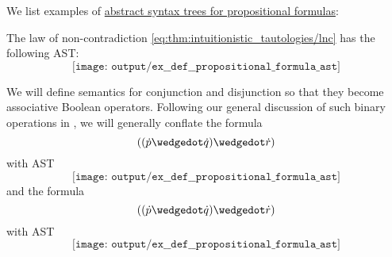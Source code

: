 \begin{example}\label{ex:def:propositional_fomula_ast}
  We list examples of \hyperref[def:propositional_fomula_ast]{abstract syntax trees for propositional formulas}:
  \begin{thmenum}
     The law of non-contradiction \eqref{eq:thm:intuitionistic_tautologies/lnc} has the following AST:
    \begin{equation*}
      \texttt{[image: output/ex\_\_def\_\_propositional\_formula\_ast]}
    \end{equation*}

     We will define semantics for conjunction and disjunction so that they become associative Boolean operators. Following our general discussion of such binary operations in , we will generally conflate the formula
    \begin{equation*}
      ((\synp \synwedge \synq) \synwedge \syn r)
    \end{equation*}
    with AST
    \begin{equation*}
      \texttt{[image: output/ex\_\_def\_\_propositional\_formula\_ast]}
    \end{equation*}
    and the formula
    \begin{equation*}
      ((\synp \synwedge \synq) \synwedge \syn r)
    \end{equation*}
    with AST
    \begin{equation*}
      \texttt{[image: output/ex\_\_def\_\_propositional\_formula\_ast]}
    \end{equation*}
  \end{thmenum}
\end{example}

